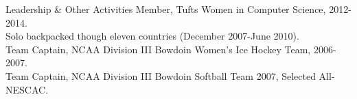 \documentclass{resume} %
\begin{document}
\begin{rSection}{Leadership \& Other Activities}
Member, Tufts Women in Computer Science, 2012-2014. \\
Solo backpacked though eleven countries (December 2007-June 2010). \\
Team Captain, NCAA Division III Bowdoin Women's Ice Hockey Team, 2006-2007.\\
Team Captain, NCAA Division III Bowdoin Softball Team 2007, Selected All-NESCAC.\\
\end{rSection}








\end{document}
